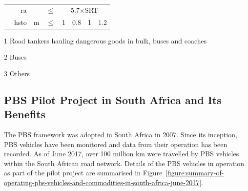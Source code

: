 \begin{table}[H]
\begin{threeparttable}
\begin{tabular}{crcccccc}
              & \gls{ra} & -     & $\leq$  & \multicolumn{4}{c}{5.7$\times$SRT} \bigstrut\\
              & \gls{hsto} & m     & $\leq$  & 1     & 0.8   & 1     & 1.2 \bigstrut\\
        \bottomrule
      \end{tabular}%
    \begin{tablenotes}
      \item[1] Road tankers hauling dangerous goods in bulk, buses and coaches
      \item[2] Buses
      \item[3] Others
    \end{tablenotes}
    \end{threeparttable}
  \end{table}%

\subsection{PBS Pilot Project in South Africa and Its Benefits}\label{section:pbs-pilot-project-in-south-africa}

    The PBS framework was adopted in South Africa in 2007. Since its inception, PBS vehicles have been monitored and data from their operation has been recorded. As of June 2017, over 100 million km were travelled by PBS vehicles within the South African road network. Details of the PBS vehicles in operation as part of the pilot project are summarised in Figure~\ref{figure:summary-of-operating-pbs-vehicles-and-commodities-in-south-africa-june-2017}.

